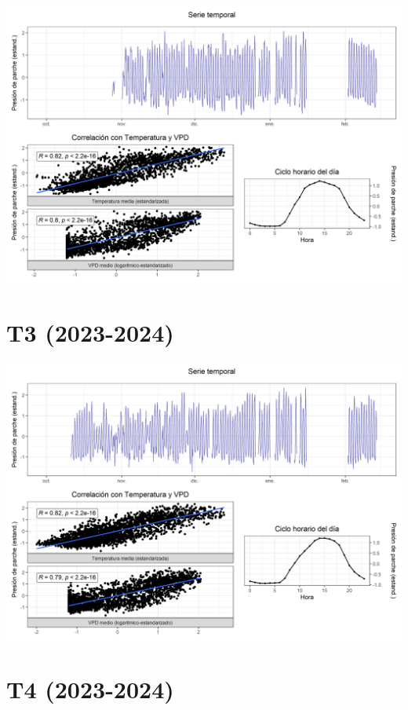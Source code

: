 \documentclass[
  letterpaper,
  DIV=11,
  numbers=noendperiod]{scrreprt}
\begin{document}
\includegraphics{figuras/05_turgor_tratamiento/2023_2024_La_Esperanza_T2.png}

\chapter{T3 (2023-2024)}

\includegraphics{figuras/05_turgor_tratamiento/2023_2024_La_Esperanza_T3.png}

\chapter{T4 (2023-2024)}
\end{document}
